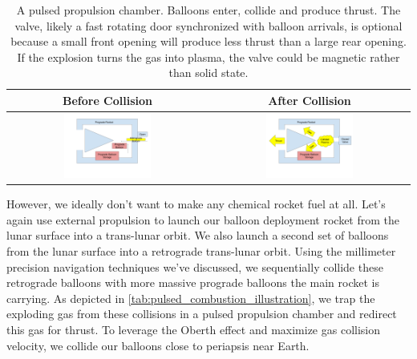 \documentclass{article}
\begin{document}
{\begin{table}[htpb!]
    \centering
    \begin{tabular}{|c|c|}
        \hline
        Before Collision & After Collision \\\hline
        \includegraphics[width=0.45\textwidth]{images/Pulsed Propulsion Chamber Before Impact.png} &
        \includegraphics[width=0.45\textwidth]{images/_Pulsed Propulsion Chamber After Impact.png} \\ \hline
         
    \end{tabular}
    \caption{A pulsed propulsion chamber.   Balloons enter, collide and produce thrust.   The valve, likely a fast rotating door synchronized with balloon arrivals, is optional because a small front opening will produce less thrust than a large rear opening.  If the explosion turns the gas into plasma, the valve could be magnetic rather than solid state.}
    \label{tab:pulsed_combustion_illustration}
\end{table}

However, we ideally don't want to make any chemical rocket fuel at all.   Let's again use external propulsion to launch our balloon deployment rocket from the lunar surface into a trans-lunar orbit.   We also launch a second set of balloons from the lunar surface into a retrograde trans-lunar orbit.   Using the millimeter precision navigation techniques we've discussed, we sequentially collide these retrograde balloons with more massive prograde balloons the main rocket is carrying.  As depicted in \autoref{tab:pulsed_combustion_illustration}, we trap the exploding gas from these collisions in a pulsed propulsion chamber and redirect this gas for thrust.   To leverage the Oberth effect and maximize gas collision velocity, we collide our balloons close to periapsis near Earth.

}
\end{document}
